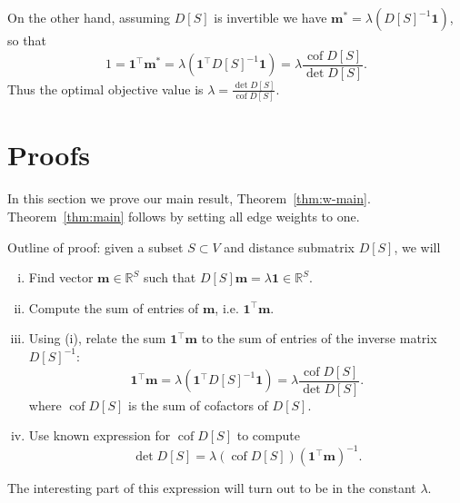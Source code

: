 \documentclass{amsart}
\theoremstyle{definition}
\newcommand{\RR}{\mathbb{R}}
\newcommand{\bone}{\mathbf{1}}
\newcommand{\boldm}{\mathbf{m}}
\newcommand{\tr}{\intercal}
\DeclareMathOperator{\cof}{cof}
\begin{document}
On the other hand,
assuming $D[S]$ is invertible we have $ \boldm^* = \lambda (D[S]^{-1} \bone) $, so that
\[
	1 = \bone^\tr \boldm^* = \lambda (\bone^\tr D[S]^{-1} \bone)
	= \lambda \frac{\cof D[S]}{\det D[S]}.
\]
Thus the optimal objective value is
$\displaystyle
	\lambda = \frac{\det D[S]}{\cof D[S]} .
$

\section{Proofs}
In this section we prove our main result, Theorem~\ref{thm:w-main}.
Theorem~\ref{thm:main} follows by setting all edge weights to one.

Outline of proof: given a  subset $S \subset V$ and distance submatrix $D[S]$, we will
\begin{enumerate}[(i)]
\item 
Find vector $\boldm \in \RR^S$ such that $D[S]\boldm = \lambda \mathbf{1} \in \RR^S$.

\item 
Compute the sum of entries of $\boldm$, i.e. $\mathbf{1}^\tr \boldm$.

\item 
Using (i), relate the sum $\bone^\tr \boldm$ to the sum of entries of the inverse matrix $D[S]^{-1}$:
$$ \mathbf{1}^\tr \boldm 
= \lambda (\mathbf{1}^\tr D[S]^{-1} \mathbf{1}) 
= \lambda \frac{\cof D[S]}{\det D[S]} .$$
where $\cof D[S]$ is the sum of cofactors of $D[S]$.

\item 
Use known expression for $\cof D[S]$ to compute
$$
\det D[S] = \lambda (\cof D[S]) \left( \mathbf{1}^\tr \boldm \right)^{-1}.
$$
\end{enumerate}
The interesting part  of this expression will turn out to be in the constant $\lambda$.
\end{document}
